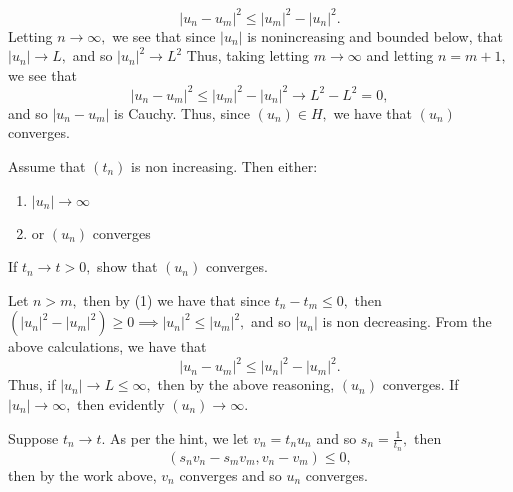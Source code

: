 \documentclass[11pt]{article}
\begin{document}
\begin{problem}
\begin{enumerate}
\begin{solution}
            \[|u_n - u_m|^2 \leq |u_m|^2 - |u_n|^2.\] Letting $n\to \infty,$  we see that since $|u_n|$ is nonincreasing and bounded below, that $|u_n|\to L,$ and so $|u_n|^2 \to L^2$ Thus, taking letting $m\to \infty$ and letting $n = m+1,$ we see that 
            \[|u_n - u_m|^2 \leq |u_m|^2 - |u_n|^2 \to L^2 - L^2 = 0,\] and so $|u_n - u_m|$ is Cauchy. Thus, since $(u_n)\in H,$ we have that $(u_n)$ converges.
        \end{solution}
        \begin{problem}
            Assume that $(t_n)$ is non increasing. Then either:
            \begin{enumerate}
                \item $|u_n|\to \infty$
                \item or $(u_n)$ converges
            \end{enumerate}
            If $t_n \to t >0,$ show that $(u_n)$ converges. 
        \end{problem}
        \begin{solution}
            Let $n>m,$ then by (1) we have that since $t_n - t_m \leq 0,$ then $(|u_n|^2 - |u_m|^2)\geq 0 \implies |u_n|^2 \leq |u_m|^2,$ and so $|u_n|$ is non decreasing. From the above calculations, we have that 
            \[|u_n - u_m|^2 \leq |u_n|^2 - |u_m|^2.\] Thus, if $|u_n| \to L \leq \infty,$ then by the above reasoning, $(u_n)$ converges. If $|u_n| \to \infty,$ then evidently $(u_n) \to \infty.$ 

            Suppose $t_n \to t.$ As per the hint, we let $v_n = t_nu_n$ and so $s_n = \frac{1}{t_n},$ then 
            \[(s_nv_n - s_mv_m, v_n - v_m)\leq 0,\] then by the work above, $v_n$ converges and so $u_n$ converges. 
        \end{solution}
    \end{enumerate}
\end{problem}

\newpage
\end{document}
